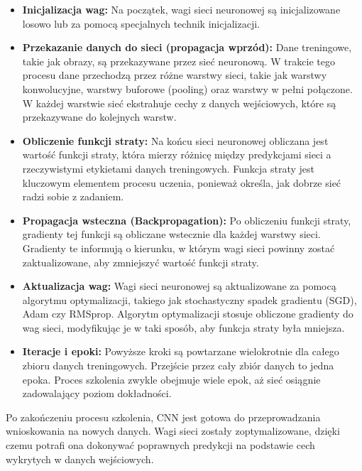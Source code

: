 \begin{itemize}
    \item \textbf{Inicjalizacja wag:} Na początek, wagi sieci neuronowej są inicjalizowane losowo lub za pomocą specjalnych technik inicjalizacji.
    \item \textbf{Przekazanie danych do sieci (propagacja wprzód):} Dane treningowe, takie jak obrazy, są przekazywane przez sieć neuronową. W trakcie tego procesu dane przechodzą przez różne warstwy sieci, takie jak warstwy konwolucyjne, warstwy buforowe (pooling) oraz warstwy w pełni połączone. W każdej warstwie sieć ekstrahuje cechy z danych wejściowych, które są przekazywane do kolejnych warstw.
    \item \textbf{Obliczenie funkcji straty:} Na końcu sieci neuronowej obliczana jest wartość funkcji straty, która mierzy różnicę między predykcjami sieci a rzeczywistymi etykietami danych treningowych. Funkcja straty jest kluczowym elementem procesu uczenia, ponieważ określa, jak dobrze sieć radzi sobie z zadaniem.
    \item \textbf{Propagacja wsteczna (Backpropagation): }Po obliczeniu funkcji straty, gradienty tej funkcji są obliczane wstecznie dla każdej warstwy sieci. Gradienty te informują o kierunku, w którym wagi sieci powinny zostać zaktualizowane, aby zmniejszyć wartość funkcji straty.
    \item \textbf{Aktualizacja wag:} Wagi sieci neuronowej są aktualizowane za pomocą algorytmu optymalizacji, takiego jak stochastyczny spadek gradientu (SGD), Adam czy RMSprop. Algorytm optymalizacji stosuje obliczone gradienty do wag sieci, modyfikując je w taki sposób, aby funkcja straty była mniejsza.
    \item \textbf{Iteracje i epoki: }Powyższe kroki są powtarzane wielokrotnie dla całego zbioru danych treningowych. Przejście przez cały zbiór danych to jedna epoka. Proces szkolenia zwykle obejmuje wiele epok, aż sieć osiągnie zadowalający poziom dokładności.
\end{itemize}
Po zakończeniu procesu szkolenia, CNN jest gotowa do przeprowadzania wnioskowania na nowych danych. Wagi sieci zostały zoptymalizowane, dzięki czemu potrafi ona dokonywać poprawnych predykcji na podstawie cech wykrytych w danych wejściowych.
